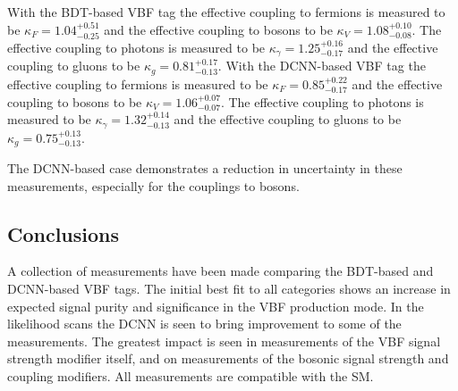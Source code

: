 With the BDT-based VBF tag the effective coupling to fermions is measured to be $\kappa_F=1.04^{+0.51}_{-0.25}$ and the effective coupling to bosons to be $\kappa_V=1.08^{+0.10}_{-0.08}$.
The effective coupling to photons is measured to be $\kappa_{\gamma}=1.25^{+0.16}_{-0.17}$ and the effective coupling to gluons to be $\kappa_{g}=0.81^{+0.17}_{-0.13}$.
With the DCNN-based VBF tag the effective coupling to fermions is measured to be $\kappa_F=0.85^{+0.22}_{-0.17}$ and the effective coupling to bosons to be $\kappa_V=1.06^{+0.07}_{-0.07}$.
The effective coupling to photons is measured to be $\kappa_{\gamma}=1.32^{+0.14}_{-0.13}$ and the effective coupling to gluons to be $\kappa_{g}=0.75^{+0.13}_{-0.13}$.


The DCNN-based case demonstrates a reduction in uncertainty in these measurements, especially for the couplings to bosons. 





\subsection{Conclusions}
A collection of measurements have been made comparing the BDT-based and DCNN-based VBF tags. 
The initial best fit to all categories shows an increase in expected signal purity and significance in the VBF production mode.
In the likelihood scans the DCNN is seen to bring improvement to some of the measurements. 
The greatest impact is seen in measurements of the VBF signal strength modifier itself, and on measurements of the bosonic signal strength and coupling modifiers.
All measurements are compatible with the SM.




